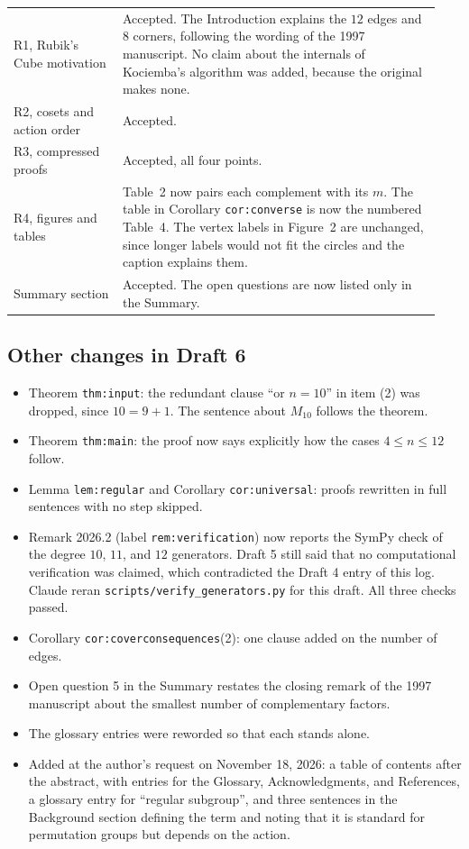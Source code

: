 \documentclass[12pt,letterpaper]{article}
\begin{document}
\begin{longtable}{@{}p{0.24\linewidth}p{0.70\linewidth}@{}}
R1, Rubik's Cube motivation & Accepted. The Introduction explains the $12$ edges and $8$ corners, following the wording of the 1997 manuscript. No claim about the internals of Kociemba's algorithm was added, because the original makes none.\\
R2, cosets and action order & Accepted.\\
R3, compressed proofs & Accepted, all four points.\\
R4, figures and tables & Table~2 now pairs each complement with its $m$. The table in Corollary \texttt{cor:converse} is now the numbered Table~4. The vertex labels in Figure~2 are unchanged, since longer labels would not fit the circles and the caption explains them.\\
Summary section & Accepted. The open questions are now listed only in the Summary.\\
\bottomrule
\end{longtable}

\subsection{Other changes in Draft 6}
\begin{itemize}
\item Theorem \texttt{thm:input}: the redundant clause ``or $n=10$'' in item (2) was dropped, since $10=9+1$. The sentence about $M_{10}$ follows the theorem.
\item Theorem \texttt{thm:main}: the proof now says explicitly how the cases $4\leq n\leq 12$ follow.
\item Lemma \texttt{lem:regular} and Corollary \texttt{cor:universal}: proofs rewritten in full sentences with no step skipped.
\item Remark 2026.2 (label \texttt{rem:verification}) now reports the SymPy check of the degree $10$, $11$, and $12$ generators. Draft 5 still said that no computational verification was claimed, which contradicted the Draft 4 entry of this log. Claude reran \texttt{scripts/verify\_generators.py} for this draft. All three checks passed.
\item Corollary \texttt{cor:coverconsequences}(2): one clause added on the number of edges.
\item Open question 5 in the Summary restates the closing remark of the 1997 manuscript about the smallest number of complementary factors.
\item The glossary entries were reworded so that each stands alone.
\item Added at the author's request on November 18, 2026: a table of contents after the abstract, with entries for the Glossary, Acknowledgments, and References, a glossary entry for ``regular subgroup'', and three sentences in the Background section defining the term and noting that it is standard for permutation groups but depends on the action.
\end{itemize}
\end{document}
